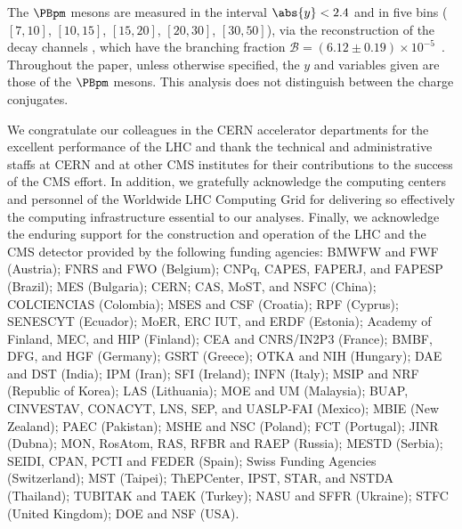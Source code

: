 The $\PBpm$ mesons are measured in the interval $\abs{y}<2.4$ and in five \pt bins ($[7,10]$, $[10,15]$, $[15,20]$, $[20,30]$, $[30,50]$\GeVc), via the reconstruction of the decay channels \Bplusminusdecay, which have the branching fraction $\mathcal{B} = (6.12 \pm 0.19) \times 10^{-5}$~\cite{pdg:2016}. Throughout the paper, unless otherwise specified, the $y$ and \pt variables given are those of the $\PBpm$ mesons. This analysis does not distinguish between the charge conjugates.

\begin{acknowledgments}
We congratulate our colleagues in the CERN accelerator departments for the excellent performance of the LHC and thank the technical and administrative staffs at CERN and at other CMS institutes for their contributions to the success of the CMS effort. In addition, we gratefully acknowledge the computing centers and personnel of the Worldwide LHC Computing Grid for delivering so effectively the computing infrastructure essential to our analyses. Finally, we acknowledge the enduring support for the construction and operation of the LHC and the CMS detector provided by the following funding agencies: BMWFW and FWF (Austria); FNRS and FWO (Belgium); CNPq, CAPES, FAPERJ, and FAPESP (Brazil); MES (Bulgaria); CERN; CAS, MoST, and NSFC (China); COLCIENCIAS (Colombia); MSES and CSF (Croatia); RPF (Cyprus); SENESCYT (Ecuador); MoER, ERC IUT, and ERDF (Estonia); Academy of Finland, MEC, and HIP (Finland); CEA and CNRS/IN2P3 (France); BMBF, DFG, and HGF (Germany); GSRT (Greece); OTKA and NIH (Hungary); DAE and DST (India); IPM (Iran); SFI (Ireland); INFN (Italy); MSIP and NRF (Republic of Korea); LAS (Lithuania); MOE and UM (Malaysia); BUAP, CINVESTAV, CONACYT, LNS, SEP, and UASLP-FAI (Mexico); MBIE (New Zealand); PAEC (Pakistan); MSHE and NSC (Poland); FCT (Portugal); JINR (Dubna); MON, RosAtom, RAS, RFBR and RAEP (Russia); MESTD (Serbia); SEIDI, CPAN, PCTI and FEDER (Spain); Swiss Funding Agencies (Switzerland); MST (Taipei); ThEPCenter, IPST, STAR, and NSTDA (Thailand); TUBITAK and TAEK (Turkey); NASU and SFFR (Ukraine); STFC (United Kingdom); DOE and NSF (USA).
\end{acknowledgments}





